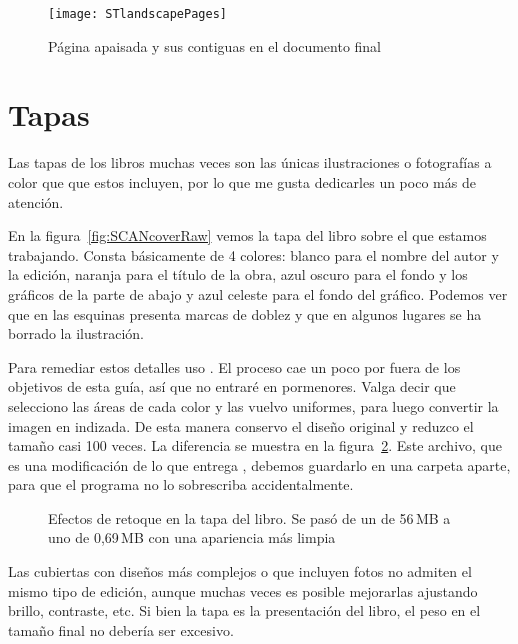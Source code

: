\documentclass[%
	a5paper,
	10pt,
	twoside,
	openright,
	final,
]{memoir}
\begin{document}
	\begin{figure}
		\texttt{[image: STlandscapePages]}
		\caption{Página apaisada y sus contiguas en el documento final\label{fig:STlandscapePages}}
	\end{figure}



	\section{Tapas\label{sec:covers}} Las tapas de los libros muchas veces son las únicas ilustraciones o fotografías a color que que estos incluyen, por lo que me gusta dedicarles un poco más de atención.

	En la figura~\ref{fig:SCANcoverRaw} vemos la tapa del libro sobre el que estamos trabajando. Consta básicamente de 4 colores: blanco para el nombre del autor y la edición, naranja para el título de la obra, azul oscuro para el fondo y los gráficos de la parte de abajo y azul celeste para el fondo del gráfico. Podemos ver que en las esquinas presenta marcas de doblez y que en algunos lugares se ha borrado la ilustración.

	Para remediar estos detalles uso \gimp. El proceso cae un poco por fuera de los objetivos de esta guía, así que no entraré en pormenores. Valga decir que selecciono las áreas de cada color y las vuelvo uniformes, para luego convertir la imagen en indizada. De esta manera conservo el diseño original y reduzco el tamaño casi 100 veces. La diferencia se muestra en la figura~\ref{fig:SCANcover}. Este archivo, que es una modificación de lo que entrega \scantailor, debemos guardarlo en una carpeta aparte, para que el programa no lo sobrescriba accidentalmente.

	\begin{figure}
		\centering
		\hfill
		\caption[Efectos de retoque en la tapa del libro]{Efectos de retoque en la tapa del libro. Se pasó de un \tiff de 56\,MB a uno de 0,69\,MB con una apariencia más limpia\label{fig:SCANcover}}
	\end{figure}

	Las cubiertas con diseños más complejos o que incluyen fotos no admiten el mismo tipo de edición, aunque muchas veces es posible mejorarlas ajustando brillo, contraste, etc. Si bien la tapa es la presentación del libro, el peso en el tamaño final no debería ser excesivo.
\end{document}
